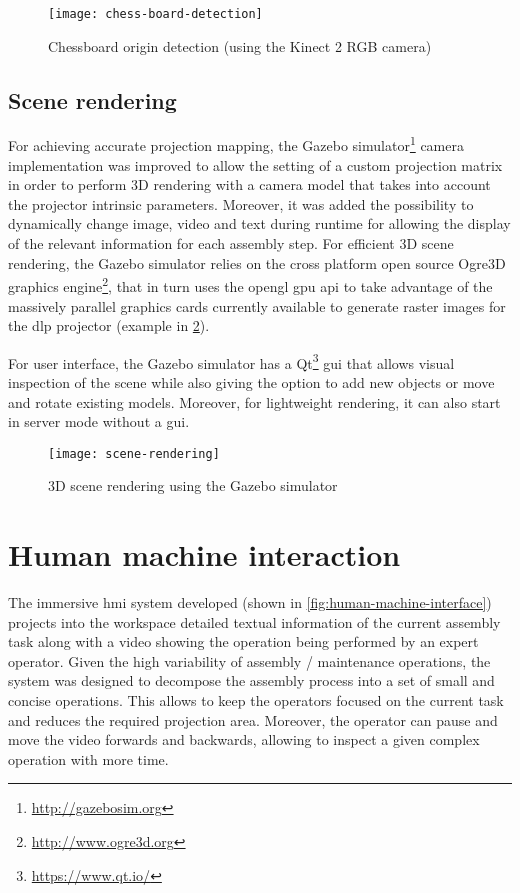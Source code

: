 \begin{figure}[H]
	\centering
	\texttt{[image: chess-board-detection]}
	\caption{Chessboard origin detection (using the Kinect 2 RGB camera)}
	\label{fig:chess-board-detection}
\end{figure}


\subsection{Scene rendering}

For achieving accurate projection mapping, the Gazebo simulator\footnote{\url{http://gazebosim.org}} camera implementation was improved to allow the setting of a custom projection matrix in order to perform 3D rendering with a camera model that takes into account the projector intrinsic parameters. Moreover, it was added the possibility to dynamically change image, video and text during runtime for allowing the display of the relevant information for each assembly step.
For efficient 3D scene rendering, the Gazebo simulator relies on the cross platform open source Ogre3D graphics engine\footnote{\url{http://www.ogre3d.org}}, that in turn uses the \gls{opengl} \gls{gpu} \gls{api} to take advantage of the massively parallel graphics cards currently available to generate raster images for the \gls{dlp} projector (example in \cref{fig:scene-rendering}).

For user interface, the Gazebo simulator has a Qt\footnote{\url{https://www.qt.io/}} \gls{gui} that allows visual inspection of the scene while also giving the option to add new objects or move and rotate existing models. Moreover, for lightweight rendering, it can also start in server mode without a \gls{gui}.

\begin{figure}
	\centering
	\texttt{[image: scene-rendering]}
	\caption{3D scene rendering using the Gazebo simulator}
	\label{fig:scene-rendering}
\end{figure}



\section{Human machine interaction}

The immersive \gls{hmi} system developed (shown in \cref{fig:human-machine-interface}) projects into the workspace detailed textual information of the current assembly task along with a video showing the operation being performed by an expert operator. Given the high variability of assembly / maintenance operations, the system was designed to decompose the assembly process into a set of small and concise operations. This allows to keep the operators focused on the current task and reduces the required projection area. Moreover, the operator can pause and move the video forwards and backwards, allowing to inspect a given complex operation with more time.


